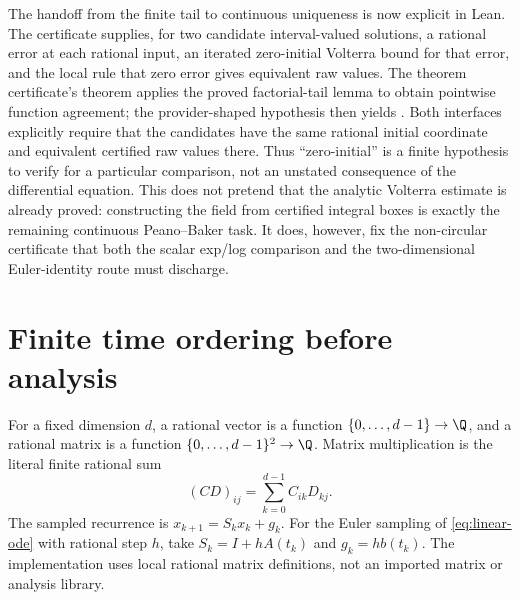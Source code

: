 The handoff from the finite tail to continuous uniqueness is now explicit in
Lean.  The  certificate supplies, for two
candidate interval-valued solutions, a rational error at each rational input,
an iterated zero-initial Volterra bound for that error, and the local rule that
zero error gives equivalent raw values.  The theorem
certificate's  theorem applies the proved factorial-tail
lemma to obtain pointwise function agreement; the provider-shaped hypothesis
 then yields
.
Both interfaces explicitly require that the candidates have the same rational
initial coordinate and equivalent certified raw values there.  Thus
``zero-initial'' is a finite hypothesis to verify for a particular comparison,
not an unstated consequence of the differential equation.
This does not pretend that the analytic Volterra estimate is already proved:
constructing the  field from certified integral boxes is
exactly the remaining continuous Peano--Baker task.  It does, however, fix
the non-circular certificate that both the scalar exp/log comparison and the
two-dimensional Euler-identity route must discharge.

\section{Finite time ordering before analysis}

\begin{definition}
\label{def:rational-linear-system}
\leanok
For a fixed dimension \(d\), a rational vector is a function
\(\{0,\ldots,d-1\}\to\Q\), and a rational matrix is a function
\(\{0,\ldots,d-1\}^2\to\Q\). Matrix multiplication is the literal finite
rational sum
\[
 (CD)_{ij}=\sum_{k=0}^{d-1}C_{ik}D_{kj}.
\]
The sampled recurrence is \(x_{k+1}=S_kx_k+g_k\). For the Euler sampling of
\eqref{eq:linear-ode} with rational step \(h\), take
\(S_k=I+hA(t_k)\) and \(g_k=hb(t_k)\). The implementation uses local
rational matrix definitions, not an imported matrix or analysis library.
\end{definition}

